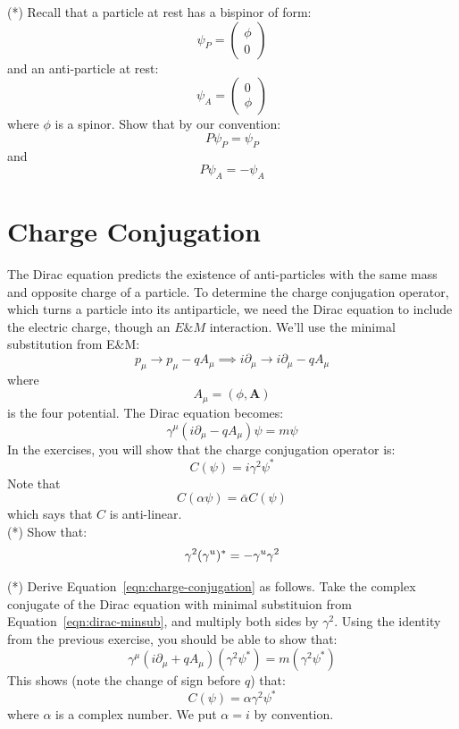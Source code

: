 \documentclass[12pt]{article}
\begin{document}
\exercise (*) Recall that a particle at rest has a bispinor of form:
$$\psi_P = \begin{pmatrix} \phi \\ 0 \end{pmatrix}$$
and an anti-particle at rest:
$$\psi_A = \begin{pmatrix} 0 \\ \phi \end{pmatrix}$$
where $\phi$ is a spinor.  Show that by our convention:
$$P \psi_P = \psi_P$$
and 
$$P \psi_A = -\psi_A$$

\section*{Charge Conjugation}

The Dirac equation predicts the existence of anti-particles with the
same mass and opposite charge of a particle.  To determine the charge
conjugation operator, which turns a particle into its antiparticle, we
need the Dirac equation to include the electric charge, though an
$E\&M$ interaction.  We'll use the minimal substitution from E\&M:
$$p_\mu \to p_\mu - q A_\mu \implies i \partial_\mu \to i \partial_\mu - qA_\mu$$
where
$$A_\mu = (\phi, \mathbf{A})$$
is the four potential.  The Dirac equation becomes:
\begin{equation}
\label{eqn:dirac-minsub}
\gamma^\mu (i \partial_{\mu} - q A_\mu) \psi = m \psi
\end{equation}
In the exercises, you will show that the charge conjugation operator is:
\begin{equation}
\label{eqn:charge-conjugation}
C(\psi) = i \gamma^2 \psi^*
\end{equation}
Note that
$$C(\alpha \psi) = \bar{\alpha} C(\psi)$$
which says that $C$ is anti-linear.\\

\exercise (*) Show that:
$$\gamma^2 (\gamma^u)^* = -\gamma^u \gamma^2\\[5pt]$$

\exercise (*) Derive Equation~\ref{eqn:charge-conjugation} as follows.
Take the complex conjugate of the Dirac equation with minimal
substituion from Equation~\ref{eqn:dirac-minsub}, and multiply both
sides by $\gamma^2$.  Using the identity from the previous exercise, you should be able to show that:
$$\gamma^\mu (i \partial_{\mu} + q A_\mu) (\gamma^2 \psi^*) = m (\gamma^2 \psi^*)$$
This shows (note the change of sign before $q$) that:
$$C(\psi) = \alpha \gamma^2 \psi^*$$
where $\alpha$ is a complex number.  We put $\alpha=i$ by convention.
\end{document}
